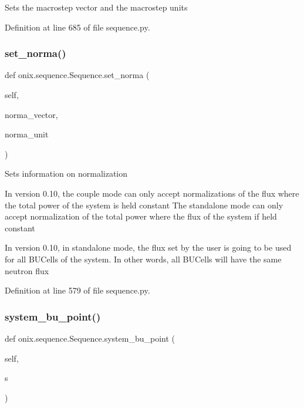 \begin{DoxyVerb}Sets the macrostep vector and the macrostep units\end{DoxyVerb}
 

Definition at line 685 of file sequence.\+py.

\mbox{\label{classonix_1_1sequence_1_1Sequence_a305d34a407ea3e779db74ee59c648fc4}} 
\subsubsection{\texorpdfstring{set\+\_\+norma()}{set\_norma()}}
{\footnotesize\ttfamily def onix.\+sequence.\+Sequence.\+set\+\_\+norma (\begin{DoxyParamCaption}\item[{}]{self,  }\item[{}]{norma\+\_\+vector,  }\item[{}]{norma\+\_\+unit }\end{DoxyParamCaption})}

\begin{DoxyVerb}Sets information on normalization

In version 0.10, the couple mode can only accept normalizations of the flux
where the total power of the system is held constant
The standalone mode can only accept normalization of the total power
where the flux of the system if held constant

In version 0.10, in standalone mode, the flux set by the user is going to be
used for all BUCells of the system. In other words, all BUCells will have the
same neutron flux\end{DoxyVerb}
 

Definition at line 579 of file sequence.\+py.

\mbox{\label{classonix_1_1sequence_1_1Sequence_acdfb4ca5840aaee86adf897c81b8d494}} 
\subsubsection{\texorpdfstring{system\+\_\+bu\+\_\+point()}{system\_bu\_point()}}
{\footnotesize\ttfamily def onix.\+sequence.\+Sequence.\+system\+\_\+bu\+\_\+point (\begin{DoxyParamCaption}\item[{}]{self,  }\item[{}]{s }\end{DoxyParamCaption})}

